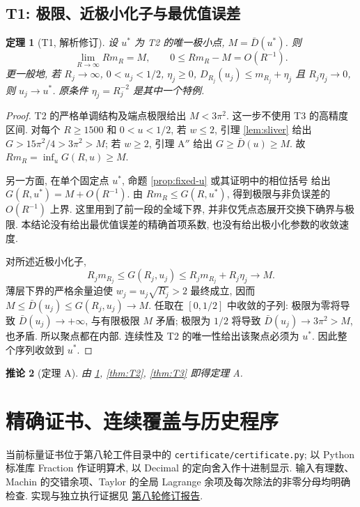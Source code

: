 \documentclass[UTF8]{ctexart}
\newtheorem{theorem}{定理}[section]
\newtheorem{corollary}[theorem]{推论}
\begin{document}
\subsection{T1: 极限、近极小化子与最优值误差}\label{sec:T1}
\begin{theorem}[T1, 解析修订]\label{thm:T1}
设 $u^*$ 为 T2 的唯一极小点, $M=\bar D(u^*)$. 则
\[
 \lim_{R\to\infty}Rm_R=M,\qquad 0\le Rm_R-M=O(R^{-1}).
\]
更一般地, 若 $R_j\to\infty$, $0<u_j<1/2$, $\eta_j\ge0$,
$D_{R_j}(u_j)\le m_{R_j}+\eta_j$ 且 $R_j\eta_j\to0$,
则 $u_j\to u^*$. 原条件 $\eta_j=R_j^{-2}$ 是其中一个特例.
\end{theorem}
\begin{proof}
T2 的严格单调结构及端点极限给出 $M<3\pi^2$.
这一步不使用 T3 的高精度区间. 对每个 $R\ge1500$ 和 $0<u<1/2$,
若 $w\le2$, 引理 \ref{lem:sliver} 给出 $G>15\pi^2/4>3\pi^2>M$;
若 $w\ge2$, 引理 A$''$ 给出 $G\ge\bar D(u)\ge M$.
故 $Rm_R=\inf_u G(R,u)\ge M$.

另一方面, 在单个固定点 $u^*$, 命题 \ref{prop:fixed-u} 或其证明中的相位括号
给出 $G(R,u^*)=M+O(R^{-1})$. 由 $Rm_R\le G(R,u^*)$, 得到极限与非负误差的 $O(R^{-1})$ 上界.
这里用到了前一段的全域下界, 并非仅凭点态展开交换下确界与极限.
本结论没有给出最优值误差的精确首项系数, 也没有给出极小化参数的收敛速度.

对所述近极小化子,
\[
 R_jm_{R_j}\le G(R_j,u_j)\le R_jm_{R_j}+R_j\eta_j\longrightarrow M.
\]
薄层下界的严格余量迫使 $w_j=u_j\sqrt{R_j}>2$ 最终成立, 因而
$M\le\bar D(u_j)\le G(R_j,u_j)\to M$.
任取在 $[0,1/2]$ 中收敛的子列: 极限为零将导致 $\bar D(u_j)\to+\infty$,
与有限极限 $M$ 矛盾; 极限为 $1/2$ 将导致 $\bar D(u_j)\to3\pi^2>M$, 也矛盾.
所以聚点都在内部. 连续性及 T2 的唯一性给出该聚点必须为 $u^*$.
因此整个序列收敛到 $u^*$.
\end{proof}

\begin{corollary}[定理 A]
由 \ref{thm:T1}, \ref{thm:T2}, \ref{thm:T3} 即得定理 A.
\end{corollary}

\section{精确证书、连续覆盖与历史程序}\label{sec:cac}

当前标量证书位于第八轮工件目录中的 \texttt{certificate/certificate.py};
以 Python 标准库 Fraction 作证明算术, 以 Decimal 的定向舍入作十进制显示.
输入有理数、Machin 的交错余项、Taylor 的全局 Lagrange 余项及每次除法的非零分母均明确检查.
实现与独立执行证据见
\href{../reports/proof-audit-round8-20260922/REPORT.md}{第八轮修订报告}.
\end{document}
